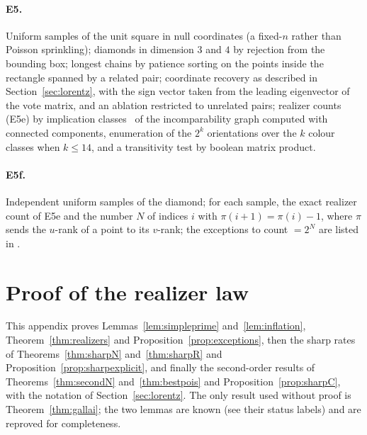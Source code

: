 \documentclass[11pt,a4paper]{article}
\theoremstyle{plain}
\theoremstyle{definition}
\theoremstyle{remark}
\begin{document}
\paragraph{E5.} Uniform samples of the unit square in null coordinates (a fixed-$n$ rather than Poisson sprinkling); diamonds in dimension $3$ and $4$ by rejection from the bounding box; longest chains by patience sorting on the points inside the rectangle spanned by a related pair; coordinate recovery as described in Section~\ref{sec:lorentz}, with the sign vector taken from the leading eigenvector of the vote matrix, and an ablation restricted to unrelated pairs; realizer counts (E5e) by implication classes~\citep{golumbic1977} of the incomparability graph computed with connected components, enumeration of the $2^k$ orientations over the $k$ colour classes when $k\le14$, and a transitivity test by boolean matrix product.
\paragraph{E5f.} Independent uniform samples of the diamond; for each sample, the exact realizer count of E5e and the number $N$ of indices $i$ with $\pi(i+1)=\pi(i)-1$, where $\pi$ sends the $u$-rank of a point to its $v$-rank; the exceptions to count $=2^N$ are listed in .

\section{Proof of the realizer law}\label{app:realizers}

This appendix proves Lemmas~\ref{lem:simpleprime} and~\ref{lem:inflation}, Theorem~\ref{thm:realizers} and Proposition~\ref{prop:exceptions}, then the sharp rates of Theorems~\ref{thm:sharpN} and~\ref{thm:sharpR} and Proposition~\ref{prop:sharpexplicit}, and finally the second-order results of Theorems~\ref{thm:secondN} and~\ref{thm:bestpois} and Proposition~\ref{prop:sharpC}, with the notation of Section~\ref{sec:lorentz}. The only result used without proof is Theorem~\ref{thm:gallai}; the two lemmas are known (see their status labels) and are reproved for completeness.
\end{document}

